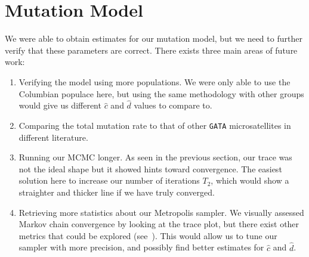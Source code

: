 \section{Mutation Model}\label{sec:mutationModel}
We were able to obtain estimates for our mutation model, but we need to further verify that these parameters are
correct.
There exists three main areas of future work:
\begin{enumerate}
    \item Verifying the model using more populations.
        We were only able to use the Columbian populace here, but using the same methodology with other groups would
        give us different $\hat{c}$ and $\hat{d}$ values to compare to.
    \item Comparing the total mutation rate to that of other \texttt{GATA} microsatellites in different literature.
    \item Running our MCMC longer.
        As seen in the previous section, our trace was not the ideal shape but it showed hints toward convergence.
        The easiest solution here to increase our number of iterations $T_2$, which would show a straighter and thicker
        line if we have truly converged.
    \item Retrieving more statistics about our Metropolis sampler.
        We visually assessed Markov chain convergence by looking at the trace plot, but there exist other metrics
        that could be explored (see~\cite{cowlesMarkovChainMonte1996}).
        This would allow us to tune our sampler with more precision, and possibly find better estimates for $\hat{c}$
        and $\hat{d}$.
\end{enumerate}

